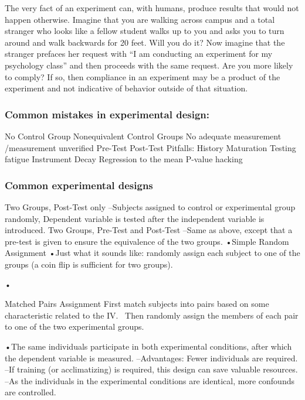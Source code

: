 \begin{refsection}
The very fact of an experiment can, with humans, produce results that would not happen otherwise. Imagine that you are walking across campus and a total stranger who looks like a fellow student walks up to you and asks you to turn around and walk backwards for 20 feet. Will you do it? Now imagine that the stranger prefaces her request with ``I am conducting an experiment for my psychology class'' and then proceeds with the same request. Are you more likely to comply? If so, then compliance in an experiment may be a product of the experiment and not indicative of behavior outside of that situation.

\subsubsection{Common mistakes in experimental design:}
\label{commonmistakesinexperimentaldesign:}

No Control Group
Nonequivalent Control Groups
No adequate measurement \slash  measurement unverified
Pre-Test Post-Test Pitfalls:
History
Maturation
Testing fatigue
Instrument Decay
Regression to the mean
P-value hacking

\subsubsection{Common experimental designs}
\label{commonexperimentaldesigns}

Two Groups, Post-Test only
–Subjects assigned to control or experimental group randomly, Dependent variable is tested after the independent variable is introduced.
Two Groups, Pre-Test and Post-Test
–Same as above, except that a pre-test is given to ensure the equivalence of the two groups.
•Simple Random Assignment
•Just what it sounds like: randomly assign each subject to one of the groups (a coin flip is sufficient for two groups).

•

Matched Pairs Assignment
 First match subjects into pairs based on some characteristic related to the IV.  Then randomly assign the members of each pair to one of the two experimental groups.

•The same individuals participate in both experimental conditions, after which the dependent variable is measured.
–Advantages: Fewer individuals are required.
–If training (or acclimatizing) is required, this design can save valuable resources.
–As the individuals in the experimental conditions are identical, more confounds are controlled.


\end{refsection}
